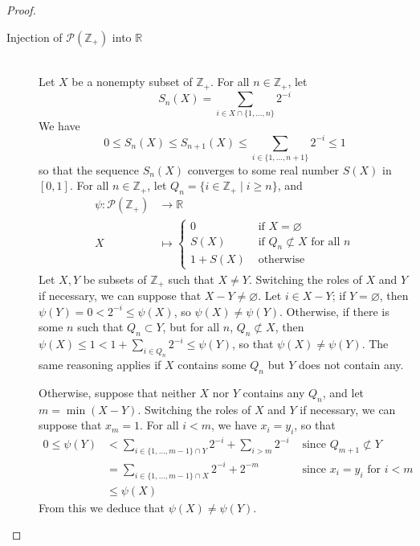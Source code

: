 \documentclass[11pt,a4paper,twoside]{article}
\theoremstyle{definition}
\begin{document}
\begin{proof}
\begin{description}
    \item[Injection of $\mathscr{P} ( \mathbb{Z}_+ )$ into $\mathbb{R}$] \hspace{0pt}\\
      Let $X$ be a nonempty subset of $\mathbb{Z}_+$. For all $n \in \mathbb{Z}_+$, let
      \begin{equation*}
        S_n ( X ) = \sum_{i \in X \cap \{ 1, \dotsc, n \}} 2^{- i}
      \end{equation*}
      We have
      \begin{equation*}
        0 \leq S_n ( X ) \leq S_{n + 1} ( X ) \leq \sum_{i \in \{ 1, \dotsc, n + 1 \}} 2^{- i} \leq 1
      \end{equation*}
      so that the sequence $S_n ( X )$ converges to some real number $S ( X )$ in $[ 0, 1 ]$.
      For all $n \in \mathbb{Z}_+$, let $Q_n = \{ i \in \mathbb{Z}_+ \mid i \geq n \}$, and
      \begin{align*}
        \psi : \mathscr{P} ( \mathbb{Z}_+ ) &\to \mathbb{R} \\
        X &\mapsto \begin{cases}
          0 &\text{ if } X = \varnothing \\
          S ( X ) &\text{ if } Q_n \not\subset X \text{ for all } n \\
          1 + S ( X ) &\text{ otherwise }
        \end{cases}
      \end{align*}
      Let $X, Y$ be subsets of $\mathbb{Z}_+$ such that $X \neq Y$. Switching the roles of $X$ and $Y$ if necessary,
      we can suppose that $X - Y \neq \varnothing$. Let $i \in X - Y$; if $Y = \varnothing$, then $\psi ( Y ) = 0 < 2^{- i} \leq \psi ( X )$,
      so $\psi ( X ) \neq \psi ( Y )$. Otherwise, if there is some $n$ such that $Q_n \subset Y$, but for all $n$, $Q_n \not\subset X$, then
      $\psi ( X ) \leq 1 < 1 + \sum_{i \in Q_n} 2^{- i} \leq \psi ( Y )$, so that $\psi ( X ) \neq \psi ( Y )$.
      The same reasoning applies if $X$ contains some $Q_n$ but $Y$ does not contain any.

      Otherwise, suppose that neither $X$ nor $Y$ contains any $Q_n$, and let $m = \min ( X - Y )$.
      Switching the roles of $X$ and $Y$ if necessary, we can suppose that $x_m = 1$. For all $i < m$, we have $x_i = y_i$, so that
      \begin{align*}
        0 \leq \psi ( Y ) &< \sum_{i \in \{ 1, \dotsc, m - 1 \} \cap Y} 2^{- i} + \sum_{i > m} 2^{- i} &\text{ since } Q_{m + 1} \not\subset Y \\
        &= \sum_{i \in \{ 1, \dotsc, m - 1 \} \cap X} 2^{-i} + 2^{- m} &\text{ since } x_i = y_i \text{ for } i < m \\
        &\leq \psi ( X )
      \end{align*}
      From this we deduce that $\psi ( X ) \neq \psi ( Y )$.


\end{description}
\end{proof}
\end{document}
